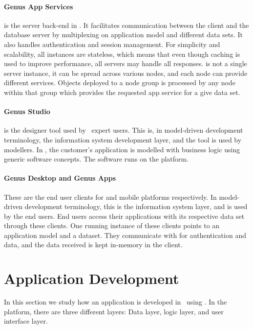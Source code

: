 \paragraph{Genus App Services}
\label{par:Genus App Services}
 is the server back-end in \gap. It facilitates communication between the client and the database server by multiplexing on application model and different data sets. It also handles authentication and session management. For simplicity and scalability, all  instances are stateless, which means that even though caching is used to improve performance, all servers may handle all responses.  is not a single server instance, it can be spread across various nodes, and each node can provide different services. Objects deployed to a node group is processed by any node within that group which provides the requested app service for a give data set.

\paragraph{Genus Studio}
\label{par:Genus Studio}
 is the designer tool used by \gap~expert users. This is, in model-driven development terminology, the information system development layer, and the tool is used by modellers. In , the customer's application is modelled with business logic using generic software concepts. The software runs on the  platform.

\paragraph{Genus Desktop and Genus Apps}
\label{par:Genus Desktop and Genus Apps}
These are the end user clients for  and mobile platforms respectively. In model-driven development terminology, this is the information system layer, and is used by the end users. End users access their applications with its respective data set through these clients. One running instance of these clients points to an application model and a dataset. They communicate with  for authentication and data, and the data received is kept in-memory in the client.

\section{Application Development}
\label{sec:Application Development}
In this section we study how an application is developed in \gap~using . In the platform, there are three  different layers: Data layer, logic layer, and user interface layer.

